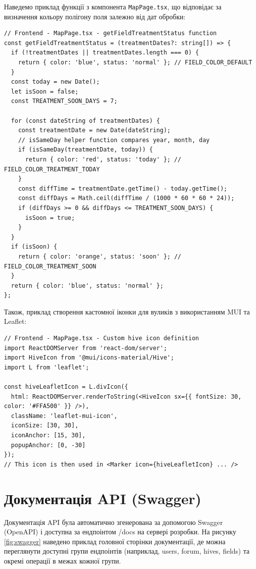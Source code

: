 Наведемо приклад функції з компонента \texttt{MapPage.tsx}, що відповідає за визначення кольору полігону поля залежно від дат обробки:
\begin{verbatim}
// Frontend - MapPage.tsx - getFieldTreatmentStatus function
const getFieldTreatmentStatus = (treatmentDates?: string[]) => {
  if (!treatmentDates || treatmentDates.length === 0) {
    return { color: 'blue', status: 'normal' }; // FIELD_COLOR_DEFAULT
  }
  const today = new Date();
  let isSoon = false;
  const TREATMENT_SOON_DAYS = 7;

  for (const dateString of treatmentDates) {
    const treatmentDate = new Date(dateString);
    // isSameDay helper function compares year, month, day
    if (isSameDay(treatmentDate, today)) {
      return { color: 'red', status: 'today' }; // FIELD_COLOR_TREATMENT_TODAY
    }
    const diffTime = treatmentDate.getTime() - today.getTime();
    const diffDays = Math.ceil(diffTime / (1000 * 60 * 60 * 24));
    if (diffDays >= 0 && diffDays <= TREATMENT_SOON_DAYS) {
      isSoon = true;
    }
  }
  if (isSoon) {
    return { color: 'orange', status: 'soon' }; // FIELD_COLOR_TREATMENT_SOON
  }
  return { color: 'blue', status: 'normal' };
};
\end{verbatim}

Також, приклад створення кастомної іконки для вуликів з використанням MUI та Leaflet:
\begin{verbatim}
// Frontend - MapPage.tsx - Custom hive icon definition
import ReactDOMServer from 'react-dom/server';
import HiveIcon from '@mui/icons-material/Hive';
import L from 'leaflet';

const hiveLeafletIcon = L.divIcon({
  html: ReactDOMServer.renderToString(<HiveIcon sx={{ fontSize: 30, color: '#FFA500' }} />),
  className: 'leaflet-mui-icon',
  iconSize: [30, 30],
  iconAnchor: [15, 30],
  popupAnchor: [0, -30]
});
// This icon is then used in <Marker icon={hiveLeafletIcon} ... />
\end{verbatim}

\chapter{Документація API (Swagger)}
\label{app:swagger_docs}
Документація API була автоматично згенерована за допомогою Swagger (OpenAPI) і доступна за ендпоінтом /docs на сервері розробки. На рисунку \ref{fig:swagger} наведено приклад головної сторінки документації, де можна переглянути доступні групи ендпоінтів (наприклад, users, forum, hives, fields) та окремі операції в межах кожної групи.

